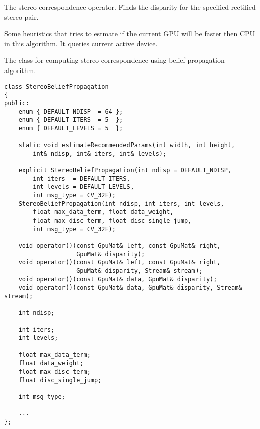 \label{cppfunc.gpu.StereoBM.operator()}
The stereo correspondence operator. Finds the disparity for the specified rectified stereo pair.


\begin{description}
\end{description}


\label{cppfunc.gpu.StereoBM.checkIfGpuCallReasonable}
Some heuristics that tries to estmate if the current GPU will be faster then CPU in this algorithm. It queries current active device.



The class for computing stereo correspondence using belief propagation algorithm.

\begin{lstlisting}
class StereoBeliefPropagation
{
public:
    enum { DEFAULT_NDISP  = 64 };
    enum { DEFAULT_ITERS  = 5  };
    enum { DEFAULT_LEVELS = 5  };

    static void estimateRecommendedParams(int width, int height, 
        int& ndisp, int& iters, int& levels);

    explicit StereoBeliefPropagation(int ndisp = DEFAULT_NDISP,
        int iters  = DEFAULT_ITERS,
        int levels = DEFAULT_LEVELS,
        int msg_type = CV_32F);
    StereoBeliefPropagation(int ndisp, int iters, int levels,
        float max_data_term, float data_weight,
        float max_disc_term, float disc_single_jump,
        int msg_type = CV_32F);

    void operator()(const GpuMat& left, const GpuMat& right, 
                    GpuMat& disparity);
    void operator()(const GpuMat& left, const GpuMat& right, 
                    GpuMat& disparity, Stream& stream);
    void operator()(const GpuMat& data, GpuMat& disparity);
    void operator()(const GpuMat& data, GpuMat& disparity, Stream& stream);

    int ndisp;

    int iters;
    int levels;

    float max_data_term;
    float data_weight;
    float max_disc_term;
    float disc_single_jump;

    int msg_type;

    ...
};
\end{lstlisting}

